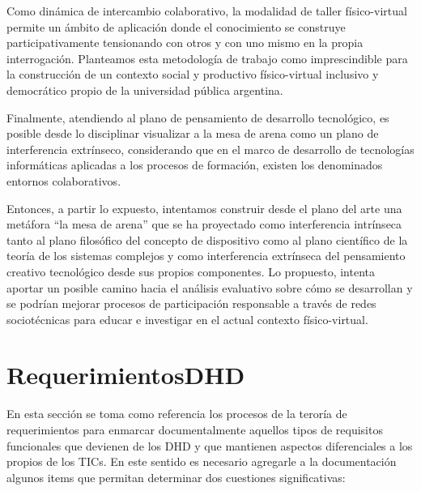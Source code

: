 Como dinámica de intercambio colaborativo, la modalidad de taller
físico-virtual permite un ámbito de aplicación donde el conocimiento se
construye participativamente tensionando con otros y con uno mismo en la
propia interrogación. Planteamos esta metodología de trabajo como
imprescindible para la construcción de un contexto social y productivo
físico-virtual inclusivo y democrático propio de la universidad pública
argentina.

Finalmente, atendiendo al plano de pensamiento de desarrollo
tecnológico, es posible desde lo disciplinar visualizar a la mesa de arena
como un plano de interferencia extrínseco, considerando que en el marco
de desarrollo de tecnologías informáticas aplicadas a los procesos de
formación, existen los denominados entornos colaborativos.

Entonces, a partir lo expuesto, intentamos construir desde el plano
del arte una metáfora “la mesa de arena” que se ha proyectado como
interferencia intrínseca tanto al plano filosófico del concepto de dispositivo
como al plano científico de la teoría de los sistemas complejos y como
interferencia extrínseca del pensamiento creativo tecnológico desde sus
propios componentes. Lo propuesto, intenta aportar un posible camino
hacia el análisis evaluativo sobre cómo se desarrollan y se podrían mejorar
procesos de participación responsable a través de redes sociotécnicas para
educar e investigar en el actual contexto físico-virtual. 





\section{RequerimientosDHD} \label{requerimientosdhd}

En esta sección se toma como referencia los procesos de la teroría de
requerimientos para enmarcar documentalmente aquellos tipos de requisitos
funcionales que devienen de los DHD y que mantienen aspectos diferenciales a
los propios de los TICs. En este sentido es necesario agregarle a la
documentación algunos items que permitan determinar dos cuestiones
significativas: 


